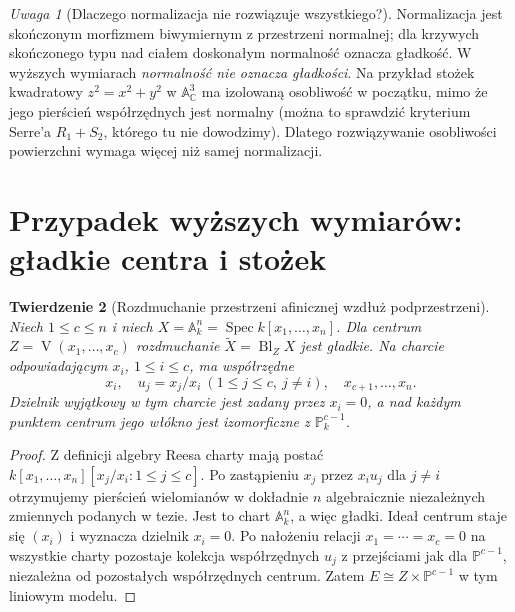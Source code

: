 \documentclass[11pt,a4paper,openany]{report}
\numberwithin{equation}{section}
\theoremstyle{plain}
\newtheorem{twierdzenie}{Twierdzenie}[section]
\theoremstyle{definition}
\theoremstyle{remark}
\newtheorem{uwaga}[twierdzenie]{Uwaga}
\newcommand{\C}{\mathbb C}
\newcommand{\A}{\mathbb A}
\newcommand{\PP}{\mathbb P}
\newcommand{\V}{\operatorname V}
\newcommand{\Spec}{\operatorname{Spec}}
\begin{document}
\begin{uwaga}[Dlaczego normalizacja nie rozwiązuje wszystkiego?]
Normalizacja jest skończonym morfizmem biwymiernym
z przestrzeni normalnej; dla krzywych skończonego typu
nad ciałem doskonałym normalność oznacza gładkość.
W wyższych wymiarach \emph{normalność nie oznacza
gładkości}. Na przykład stożek kwadratowy
$z^2=x^2+y^2$ w $\A^3_\C$ ma izolowaną osobliwość
w początku, mimo że jego pierścień współrzędnych
jest normalny (można to sprawdzić kryterium Serre'a
$R_1+S_2$, którego tu nie dowodzimy).
Dlatego rozwiązywanie osobliwości powierzchni
wymaga więcej niż samej normalizacji.
\end{uwaga}

\section{Przypadek wyższych wymiarów: gładkie centra i stożek}
\label{sec:ga5-higherdim}

\begin{twierdzenie}[Rozdmuchanie przestrzeni afinicznej wzdłuż podprzestrzeni]
\label{tw:ga5-smooth-center-model}
Niech $1\le c\le n$ i niech
$X=\A^n_k=\Spec k[x_1,\ldots,x_n]$.
Dla centrum $Z=\V(x_1,\ldots,x_c)$ rozdmuchanie
$\widetilde X=\operatorname{Bl}_Z X$ jest gładkie.
Na charcie odpowiadającym $x_i$, $1\le i\le c$,
ma współrzędne
\[
 x_i,\quad u_j=x_j/x_i\ (1\le j\le c,\ j\ne i),
 \quad x_{c+1},\ldots,x_n.
\]
Dzielnik wyjątkowy w tym charcie jest zadany
przez $x_i=0$, a nad każdym punktem centrum jego
włókno jest izomorficzne z $\PP^{c-1}_k$.
\end{twierdzenie}
\begin{proof}
Z definicji algebry Reesa charty mają postać
$k[x_1,\ldots,x_n][x_j/x_i:1\le j\le c]$.
Po zastąpieniu $x_j$ przez $x_i u_j$ dla $j\ne i$
otrzymujemy pierścień wielomianów w dokładnie
$n$ algebraicznie niezależnych zmiennych podanych
w tezie. Jest to chart $\A^n_k$, a więc gładki.
Ideał centrum staje się $(x_i)$ i wyznacza dzielnik
$x_i=0$. Po nałożeniu relacji $x_1=\cdots=x_c=0$
na wszystkie charty pozostaje kolekcja współrzędnych
$u_j$ z przejściami jak dla $\PP^{c-1}$,
niezależna od pozostałych współrzędnych centrum.
Zatem $E\cong Z\times\PP^{c-1}$ w tym liniowym modelu.
\end{proof}
\end{document}
